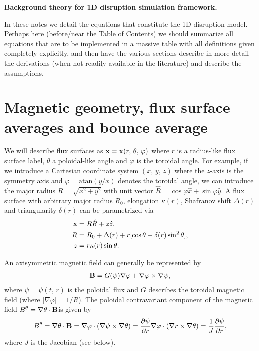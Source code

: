 \documentclass[11pt,a4paper]{article}
\renewcommand{\b}[1]{\ensuremath{ {\bf #1 } }}
\begin{document}
\begin{center}
\Large \bf Background theory for 1D disruption simulation framework.
\end{center}

\vspace{10mm}

In these notes we detail the equations that constitute the 1D disruption model. Perhaps here (before/near the Table of Contents) we should summarize all equations that are to be implemented in a massive table with all definitions given completely explicitly, and then have the various sections describe in more detail the derivations (when not readily available in the literature) and describe the assumptions.


\tableofcontents



\section{Magnetic geometry, flux surface averages and bounce average}
We will describe flux surfaces as $\b{x} = \b{x}(r,\,\theta,\,\varphi)$ where $r$ is a radius-like flux surface label, $\theta$ a poloidal-like angle and $\varphi$ is the toroidal angle. For example, if we introduce a Cartesian coordinate system $(x,\,y,\,z)$ where the $z$-axis is the symmetry axis and $\varphi = \text{atan}(y/x)$ denotes the toroidal angle, we can introduce the major radius $R = \sqrt{x^2+y^2}$ with unit vector $\hat{R} = \cos\varphi \hat{x} + \sin\varphi \hat{y}$. A flux surface with arbitrary major radius $R_0$, elongation $\kappa(r)$, Shafranov shift $\Delta(r)$ and triangularity $\delta(r)$ can be parametrized via
\begin{align}
\b{x} &= R\hat{R} + z\hat{z}, \nonumber \\
R &= R_0 + \Delta(r) + r[\cos\theta -\delta(r) \sin^2\theta], \nonumber \\
z &= r \kappa(r) \sin\theta.
\label{eq:geometry coordinates}
\end{align}

An axisymmetric magnetic field can generally be represented by
\begin{align}
\b{B} = G(\psi) \nabla \varphi + \nabla \varphi \times \nabla \psi,
\end{align}
where $\psi = \psi(t,\,r)$ is the poloidal flux and $G$ describes the toroidal magnetic field (where $|\nabla \varphi | = 1/R$). The poloidal contravariant component of the magnetic field $B^\theta = \nabla\theta \cdot \b{B}$is given by
\begin{align}
B^\theta = \nabla \theta \cdot \b{B} = \nabla\varphi\cdot(\nabla \psi \times \nabla \theta) = \frac{\partial \psi}{\partial r} \nabla \varphi\cdot(\nabla r \times \nabla \theta) = \frac{1}{J} \frac{\partial \psi}{\partial r},
\end{align}
where $J$ is the Jacobian (see below).
\end{document}
